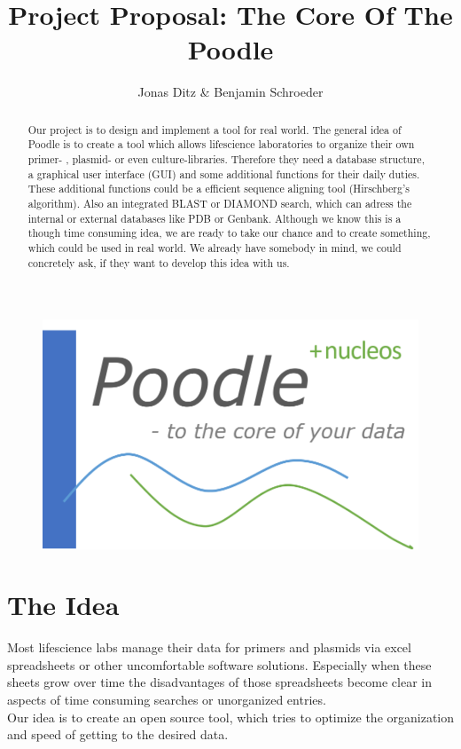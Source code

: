 \documentclass[]{article}
\title{Project Proposal: The Core Of The Poodle}
\author{Jonas Ditz  \& Benjamin Schroeder}
\begin{document}
\maketitle
\begin{figure}[h]
	\centering
	\includegraphics[scale=0.35]{img/logo_poodle.png}
\end{figure}

\begin{abstract}
Our project is to design and implement a tool for real world. The general idea of Poodle is to create a tool which allows lifescience laboratories to organize their own primer- , plasmid- or even culture-libraries. Therefore they need a database structure, a graphical user interface (GUI) and some additional functions for their daily duties. These additional functions could be a efficient sequence aligning tool (Hirschberg's algorithm). Also an integrated BLAST or DIAMOND search, which can adress the internal or external databases like PDB or Genbank. Although we know this is a though time consuming idea, we are ready to take our chance and to create something, which could be used in real world. We already have somebody in mind, we could concretely ask, if they want to develop this idea with us. 
\end{abstract}

\section{ The Idea}
Most lifescience labs manage their data for primers and plasmids via excel spreadsheets or other uncomfortable software solutions. Especially when these sheets grow over time the disadvantages of those spreadsheets become clear in aspects of time consuming searches or unorganized entries. 
\\
Our idea is to create an open source tool, which tries to optimize the organization and speed of getting to the desired data.
\end{document}
